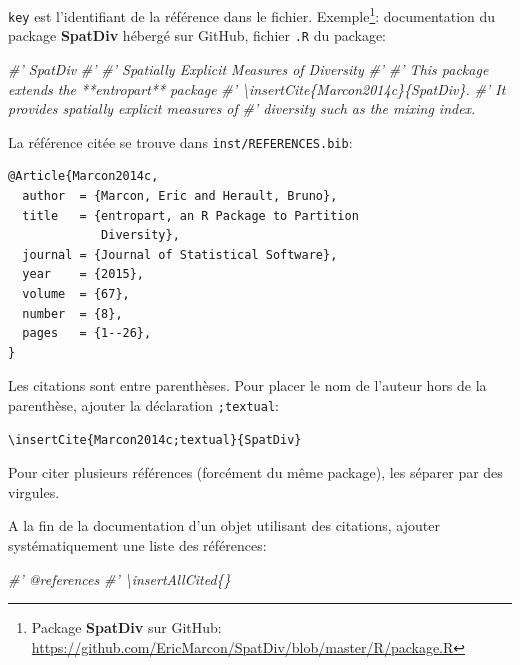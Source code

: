 \documentclass[
  12pt,
  french,
  a4paper,
  extrafontsizes,onecolumn,openright
  ]{memoir}
\newenvironment{Shaded}{\begin{snugshade}}{\end{snugshade}}
\newcommand{\CommentTok}[1]{\textcolor[rgb]{0.56,0.35,0.01}{\textit{#1}}}
\begin{document}
\texttt{key} est l'identifiant de la référence dans le fichier.
Exemple\footnote{Package \textbf{SpatDiv} sur GitHub: \url{https://github.com/EricMarcon/SpatDiv/blob/master/R/package.R}}: documentation du package \textbf{SpatDiv} hébergé sur GitHub, fichier \texttt{.R} du package:

\scriptsize

\begin{Shaded}
\begin{Highlighting}[]
\CommentTok{#' SpatDiv}
\CommentTok{#'}
\CommentTok{#' Spatially Explicit Measures of Diversity}
\CommentTok{#' }
\CommentTok{#' This package extends the **entropart** package}
\CommentTok{#' \textbackslash{}insertCite\{Marcon2014c\}\{SpatDiv\}.}
\CommentTok{#' It provides spatially explicit measures of }
\CommentTok{#' diversity such as the mixing index.}
\end{Highlighting}
\end{Shaded}

\normalsize

La référence citée se trouve dans \texttt{inst/REFERENCES.bib}:

\begin{verbatim}
@Article{Marcon2014c,
  author  = {Marcon, Eric and Herault, Bruno},
  title   = {entropart, an R Package to Partition 
             Diversity},
  journal = {Journal of Statistical Software},
  year    = {2015},
  volume  = {67},
  number  = {8},
  pages   = {1--26},
}
\end{verbatim}

Les citations sont entre parenthèses.
Pour placer le nom de l'auteur hors de la parenthèse, ajouter la déclaration \texttt{;textual}:

\begin{verbatim}
\insertCite{Marcon2014c;textual}{SpatDiv}
\end{verbatim}

Pour citer plusieurs références (forcément du même package), les séparer par des virgules.

A la fin de la documentation d'un objet utilisant des citations, ajouter systématiquement une liste des références:

\scriptsize

\begin{Shaded}
\begin{Highlighting}[]
\CommentTok{#' @references}
\CommentTok{#' \textbackslash{}insertAllCited\{\}}
\end{Highlighting}
\end{Shaded}
\end{document}
